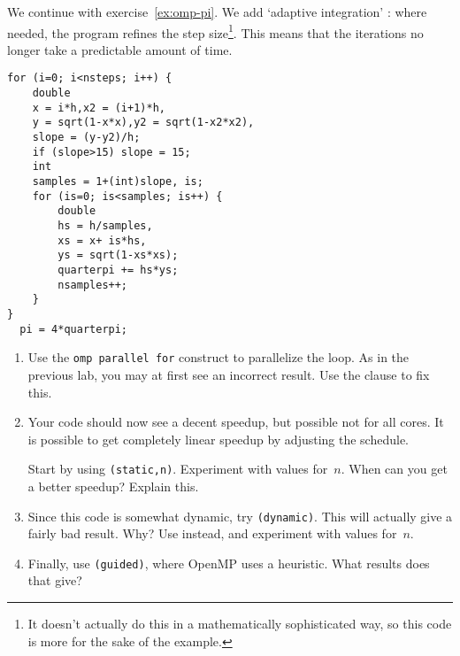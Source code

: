 \begin{exercise}
  \label{ex:omp-pi-adapt}
  We continue with exercise~\ref{ex:omp-pi}.
  We add `adaptive integration'%
  :
  where needed, the program refines the step
  size\footnote{It doesn't actually do this in a mathematically
    sophisticated way, so this code is more for the sake of the
    example.}.  This means that the iterations no longer take a
  predictable amount of time.

\begin{multicols}{2}
\begin{lstlisting}
for (i=0; i<nsteps; i++) {
    double
    x = i*h,x2 = (i+1)*h,
    y = sqrt(1-x*x),y2 = sqrt(1-x2*x2),
    slope = (y-y2)/h;
    if (slope>15) slope = 15;
    int
    samples = 1+(int)slope, is;
    for (is=0; is<samples; is++) {
        double
        hs = h/samples,
        xs = x+ is*hs,
        ys = sqrt(1-xs*xs);
        quarterpi += hs*ys;
        nsamples++;
    }
}
  pi = 4*quarterpi;
\end{lstlisting}
\end{multicols}

\begin{enumerate}
\item Use the \lstinline{omp parallel for} construct to parallelize the loop.
  As in the previous lab, you may at first see an incorrect result.
  Use the  clause to fix this.
\item Your code should now see a decent speedup, but possible not for all cores.
  It is possible to get completely linear speedup by adjusting the schedule.

  Start by using \lstinline{(static,n)}.
  Experiment with values for~$n$.
  When can you get a better speedup? Explain this.
\item Since this code is somewhat dynamic, try \lstinline{(dynamic)}.
  This will actually give a fairly bad result. Why?  Use
   instead, and experiment with values
  for~$n$.
\item Finally, use \lstinline{(guided)}, where OpenMP uses a
  heuristic.  What results does that give?
\end{enumerate}
     
\end{exercise}

